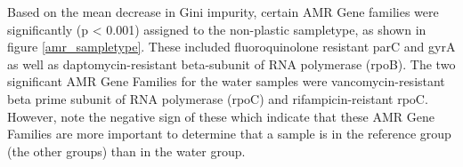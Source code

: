 Based on the mean decrease in Gini impurity, certain AMR Gene families were significantly (p < 0.001) assigned to the non-plastic sampletype, as shown in figure \ref{amr_sampletype}. These included fluoroquinolone resistant parC and gyrA as well as daptomycin-resistant beta-subunit of RNA polymerase (rpoB). 
The two significant AMR Gene Families for the water samples were vancomycin-resistant beta prime subunit of RNA polymerase (rpoC) and rifampicin-reistant rpoC. 
However, note the negative sign of these which indicate that these AMR Gene Families are more important to determine that a sample is in the reference group (the other groups) than in the water group. 

